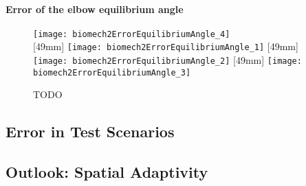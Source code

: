 \paragraph{Error of the elbow equilibrium angle}

\dummytext{}

\begin{figure}
  \texttt{[image: biomech2ErrorEquilibriumAngle\_4]}%
  \\[2mm]%
  [49mm]{%
    \texttt{[image: biomech2ErrorEquilibriumAngle\_1]}%
  }%
  \hfill%
  [49mm]{%
    \texttt{[image: biomech2ErrorEquilibriumAngle\_2]}%
  }%
  \hfill%
  [49mm]{%
    \texttt{[image: biomech2ErrorEquilibriumAngle\_3]}%
  }%
  \caption[TODO]{%
    TODO%
  }%
  \label{fig:TODO2}%
\end{figure}



\subsection{Error in Test Scenarios}
\label{sec:733scenarios}

\dummytext[3]{}



\subsection{Outlook: Spatial Adaptivity}
\label{sec:734adaptivity}

\dummytext[3]{}
